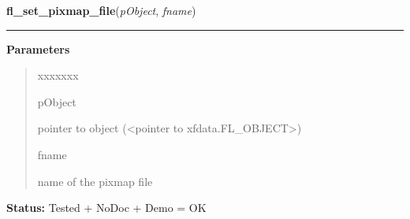 \hspace{.8\funcindent}\begin{boxedminipage}{\funcwidth}

    \raggedright \textbf{fl\_set\_pixmap\_file}(\textit{pObject}, \textit{fname})

    \vspace{-1.5ex}

    \rule{\textwidth}{0.5\fboxrule}
\setlength{\parskip}{2ex}
\setlength{\parskip}{1ex}
      \textbf{Parameters}
      \vspace{-1ex}

      \begin{quote}
        \begin{Ventry}{xxxxxxx}

          \item[pObject]

          pointer to object ({\textless}pointer to 
          xfdata.FL\_OBJECT{\textgreater})

          \item[fname]

          name of the pixmap file

        \end{Ventry}

      \end{quote}

\textbf{Status:} Tested + NoDoc + Demo = OK



    \end{boxedminipage}

    \label{xformslib:library:fl_set_pixmap_file}

    \vspace{0.5ex}

